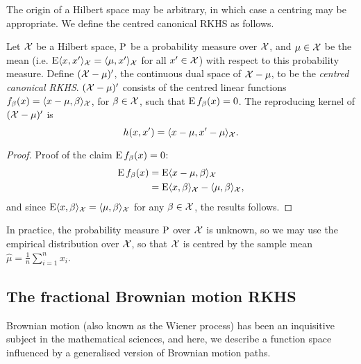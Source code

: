 The origin of a Hilbert space may be arbitrary, in which case a centring may be appropriate.
We define the centred canonical RKHS as follows.

\begin{definition}
  Let ${\mathcal X}$ be a Hilbert space, $\operatorname{P}$ be a probability measure over ${\mathcal X}$, and $\mu\in{\mathcal X}$ be the mean (i.e. $\operatorname{E}\langle x,x'\rangle_{{\mathcal X}}  = \langle\mu,x'\rangle_{{\mathcal X}}$ for all $x' \in {\mathcal X}$) with respect to this probability measure.
  Define $({\mathcal X} - \mu)'$, the continuous dual space of ${\mathcal X} - \mu$, to be the \emph{centred canonical RKHS}.
  $({\mathcal X} - \mu)'$ consists of the centred linear functions $f_\beta(x)=\langle x-\mu,\beta\rangle_{\mathcal X}$, for $\beta\in{\mathcal X}$, such that $\operatorname{E} f_\beta(x) = 0$.
  The reproducing kernel of $({\mathcal X} - \mu)'$ is
  \[
    h(x,x') = \langle x-\mu,x'-\mu\rangle_{\mathcal X}.
  \]
\end{definition}

\begin{proof}
  Proof of the claim $\operatorname{E} f_\beta(x) = 0$:
  \begin{align*}
    \operatorname{E} f_\beta(x) 
    &= \operatorname{E} \langle x-\mu,\beta\rangle_{\mathcal X} \\
    &= \operatorname{E} \langle x,\beta\rangle_{\mathcal X} - \langle\mu,\beta\rangle_{\mathcal X},
  \end{align*}
  and since $\operatorname{E} \langle x,\beta\rangle_{\mathcal X} = \langle\mu,\beta\rangle_{\mathcal X}$ for any $\beta\in{\mathcal X}$, the results follows.
\end{proof}

\begin{remark}
  In practice, the probability measure $\operatorname{P}$ over ${\mathcal X}$ is unknown, so we may use the empirical distribution over ${\mathcal X}$, so that ${\mathcal X}$ is centred by the sample mean $\hat\mu = \frac{1}{n}\sum_{i=1}^n x_i$.  
\end{remark}


\subsection{The fractional Brownian motion RKHS}

Brownian motion (also known as the Wiener process) has been an inquisitive subject in the mathematical sciences, and here, we describe a function space influenced by a generalised version of Brownian motion paths.

